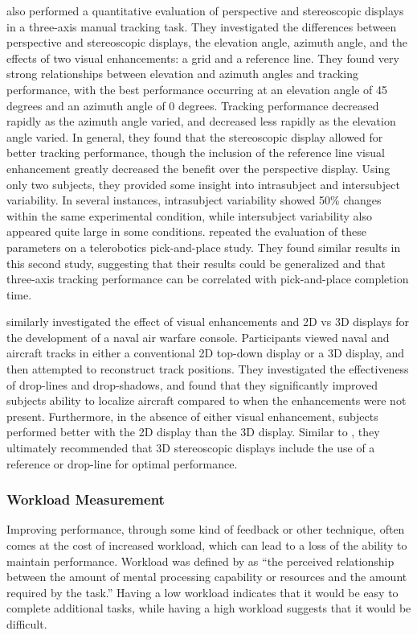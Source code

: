 \citeauthor{kim_quantitative_1987} also performed a quantitative evaluation of perspective and stereoscopic displays in a three-axis manual tracking task.
They investigated the differences between perspective and stereoscopic displays, the elevation angle, azimuth angle, and the effects of two visual enhancements: a grid and a reference line.
They found very strong relationships between elevation and azimuth angles and tracking performance, with the best performance occurring at an elevation angle of 45 degrees and an azimuth angle of 0 degrees.
Tracking performance decreased rapidly as the azimuth angle varied, and decreased less rapidly as the elevation angle varied.
In general, they found that the stereoscopic display allowed for better tracking performance, though the inclusion of the reference line visual enhancement greatly decreased the benefit over the perspective display.
Using only two subjects, they provided some insight into intrasubject and intersubject variability.
In several instances, intrasubject variability showed 50\% changes within the same experimental condition, while intersubject variability also appeared quite large in some conditions.
\citeauthor{kim_visual_1987} repeated the evaluation of these parameters on a telerobotics pick-and-place study.
They found similar results in this second study, suggesting that their results could be generalized and that three-axis tracking performance can be correlated with pick-and-place completion time.

\citeauthor{smallman_track_2000} similarly investigated the effect of visual enhancements and 2D vs 3D displays for the development of a naval air warfare console.
Participants viewed naval and aircraft tracks in either a conventional 2D top-down display or a 3D display, and then attempted to reconstruct track positions.
They investigated the effectiveness of drop-lines and drop-shadows, and found that they significantly improved subjects ability to localize aircraft compared to when the enhancements were not present.
Furthermore, in the absence of either visual enhancement, subjects performed better with the 2D display than the 3D display.
Similar to \citeauthor{kim_quantitative_1987}, they ultimately recommended that 3D stereoscopic displays include the use of a reference or drop-line for optimal performance.

\subsubsection{Workload Measurement}
Improving performance, through some kind of feedback or other technique, often comes at the cost of increased workload, which can lead to a loss of the ability to maintain performance.
Workload was defined by \cite{hart_development_1988} as ``the perceived relationship between the amount of mental processing capability or resources and the amount required by the task.''
Having a low workload indicates that it would be easy to complete additional tasks, while having a high workload suggests that it would be difficult.

